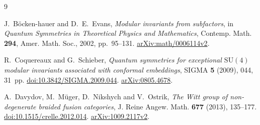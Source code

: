 \documentclass[11pt]{amsart}
\theoremstyle{remark}
\newcommand{\SU}{\mathrm{SU}}
\begin{document}
\begin{thebibliography}{9}

J.~B\"ocken-hauer and D.~E.~Evans,
\emph{Modular invariants from subfactors},
in \emph{Quantum Symmetries in Theoretical Physics and Mathematics},
Contemp. Math. \textbf{294}, Amer. Math. Soc., 2002, pp.~95--131.
\href{https://arxiv.org/abs/math/0006114}{arXiv:math/0006114v2}.

R.~Coquereaux and G.~Schieber,
\emph{Quantum symmetries for exceptional $\SU(4)$ modular invariants
associated with conformal embeddings},
SIGMA \textbf{5} (2009), 044, 31~pp.
\href{https://doi.org/10.3842/SIGMA.2009.044}{doi:10.3842/SIGMA.2009.044}.
\href{https://arxiv.org/abs/0805.4678}{arXiv:0805.4678}.

A.~Davydov, M.~M\"uger, D.~Nikshych and V.~Ostrik,
\emph{The Witt group of non-degenerate braided fusion categories},
J. Reine Angew. Math. \textbf{677} (2013), 135--177.
\href{https://doi.org/10.1515/crelle.2012.014}{doi:10.1515/crelle.2012.014}.
\href{https://arxiv.org/abs/1009.2117}{arXiv:1009.2117v2}.

\end{thebibliography}
\end{document}
